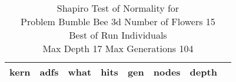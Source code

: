 \begin{table}[H]
\caption{Shapiro Test of Normality for \\ Problem  Bumble Bee 3d  Number of Flowers 15\\Best of Run Individuals \\ Max Depth 17 Max Generations 104\\}
\begin{center}
\scalebox{0.8} %
{
\begin{tabular}{lrrrrrrr}
\hline
kern & adfs & what & hits & gen & nodes & depth \\
\hline


\end{tabular}
}
\end{center}
\end{table}

